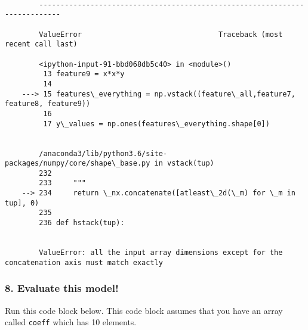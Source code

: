 \documentclass[11pt]{article}
\begin{document}
    \begin{Verbatim}[commandchars=\\\{\}]

        ---------------------------------------------------------------------------

        ValueError                                Traceback (most recent call last)

        <ipython-input-91-bbd068db5c40> in <module>()
         13 feature9 = x*x*y
         14 
    ---> 15 features\_everything = np.vstack((feature\_all,feature7, feature8, feature9))
         16 
         17 y\_values = np.ones(features\_everything.shape[0])


        /anaconda3/lib/python3.6/site-packages/numpy/core/shape\_base.py in vstack(tup)
        232 
        233     """
    --> 234     return \_nx.concatenate([atleast\_2d(\_m) for \_m in tup], 0)
        235 
        236 def hstack(tup):


        ValueError: all the input array dimensions except for the concatenation axis must match exactly

    \end{Verbatim}

    \subsubsection{8. Evaluate this model!}\label{evaluate-this-model}

Run this code block below. This code block assumes that you have an
array called \texttt{coeff} which has 10 elements.
\end{document}
